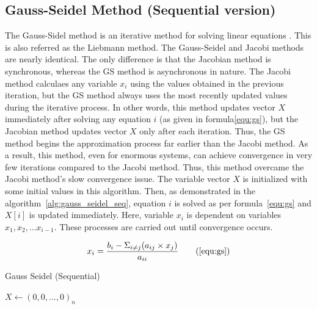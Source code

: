 \documentclass[11pt]{article}       %
\begin{document}
\subsection{Gauss-Seidel Method (Sequential version)}

The Gauss-Sidel method is an iterative method for solving linear equations \cite{7396262}. This  is also referred as the Liebmann method. The Gauss-Seidel and Jacobi methods are nearly identical. The only difference is that the Jacobian method is synchronous, whereas the GS method is asynchronous in nature. The Jacobi method calculaes any variable $x_i$ using the values obtained in the previous iteration, but the GS method always uses the most recently updated values during the iterative process. In other words, this method updates vector $X$ immediately after solving any equation $i$ (as given in formula\eqref{equ:gs}), but the Jacobian method updates vector $X$ only after each iteration. Thus, the GS method begins the approximation process far earlier than the Jacobi method. As a result, this method, even for enormous systems, can achieve convergence in very few iterations compared to the Jacobi method. Thus, this method overcame the Jacobi method's slow convergence issue. The variable vector $X$ is initialized with some initial values in this algorithm. Then, as demonstrated in the algorithm~\ref{alg:gauss_seidel_seq}, equation $i$ is solved as per formula~\eqref{equ:gs} and $X[i]$ is updated immediately. Here, variable $x_i$ is dependent on variables ${x_1, x_2,... x_{i-1}}$. These processes are carried out until convergence occurs.

\begin{subequations}\label{equ:gs}
\begin{align*}
x_i = \frac{b_i - \Sigma_{i \ne j}(a_{ij} \times x_j)}{a_{ii}}
\tag{\ref{equ:gs}}
\end{align*}
\end{subequations}

\begin{algorithm}
\DontPrintSemicolon 
\caption{Gauss Seidel (Sequential)}\label{alg:gauss_seidel_seq}
$X \gets (0,0,...,0)_n$\;
 \While{until convergence}{
  \For{$i \gets 0$ \KwTo $size$}{
   $X[i] \gets B[i]$\;
   \For{$j \gets 0$ \KwTo $size$}{
    \If{$i \ne j$}{
     $X[i] \gets X[[i] - (A[i][j] \times X[j])$\;
    }
   }
   $X[i] \gets X[i] / A[i][i]$ \Comment*[r]{Immediate update variable vector X}
  }
 }
\end{algorithm}
\end{document}
